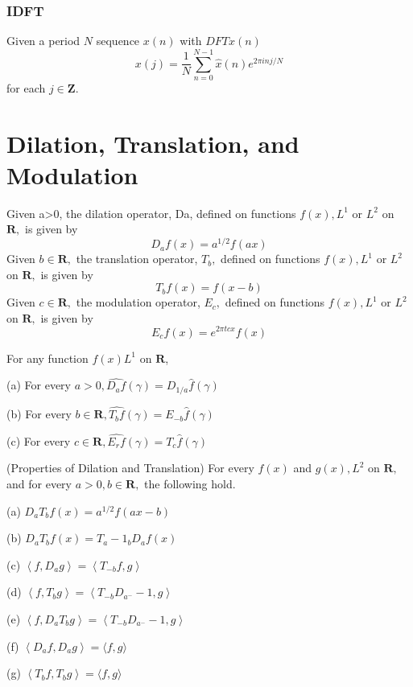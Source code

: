 \subsubsection{IDFT}
\begin{definition}
Given a period $N$ sequence $x(n)$ with $D F T \widehat{x}(n)$
$$
x(j)=\frac{1}{N} \sum_{n=0}^{N-1} \widehat{x}(n) e^{2 \pi i n j / N}
$$
for each $j \in \mathbf{Z}$.
\end{definition}


\section{Dilation, Translation, and Modulation}

\begin{definition}
 Given a>0, the dilation operator, Da, defined on functions
$f(x), L^{1}$ or $L^{2}$ on $\mathbf{R},$ is given by
$$
D_{a} f(x)=a^{1 / 2} f(a x)
$$
Given $b \in \mathbf{R},$ the translation operator, $T_{b},$ defined on functions $f(x), L^{1}$ or $L^{2}$
on $\mathbf{R},$ is given by
$$
T_{b} f(x)=f(x-b)
$$
Given $c \in \mathbf{R},$ the modulation operator, $E_{c},$ defined on functions $f(x), L^{1}$ or $L^{2}$
on $\mathbf{R},$ is given by
$$
E_{c} f(x)=e^{2 \pi t c x} f(x)
$$

\end{definition}

\begin{theorem}

For any function $f(x) L^{1}$ on $\mathbf{R}$,

(a) For every $a>0, \widehat{D_{a} f}(\gamma)=D_{1 / a} \widehat{f}(\gamma)$

(b) For every $b \in \mathbf{R}, \widehat{T_{b} f}(\gamma)=E_{-b} \widehat{f}(\gamma)$

(c) For every $c \in \mathbf{R}, \widehat{E_{r} f}(\gamma)=T_{c} \widehat{f}(\gamma)$
\end{theorem}

\begin{theorem}
(Properties of Dilation and Translation) For every $f(x)$ and
$g(x), L^{2}$ on $\mathbf{R},$ and for every $a>0, b \in \mathbf{R},$ the following hold.

(a) $D_{a} T_{b} f(x)=a^{1 / 2} f(a x-b)$

(b) $D_{a} T_{b} f(x)=T_{a}-1_{b} D_{a} f(x)$

(c) $\left\langle f, D_{a} g\right\rangle=\left\langle T_{-b} f, g\right\rangle$

(d) $\left\langle f, T_{b} g\right\rangle=\left\langle T_{-b} D_{a^{-}}-1, g\right\rangle$

(e) $\left\langle f, D_{a} T_{b} g\right\rangle=\left\langle T_{-b} D_{a^{-}}-1, g\right\rangle$

(f) $\left\langle D_{a} f, D_{a} g\right\rangle=\langle f, g\rangle$

(g) $\left\langle T_{b} f, T_{b} g\right\rangle=\langle f, g\rangle$
\end{theorem}


